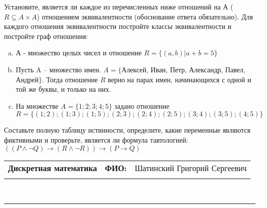 \documentclass[10pt]{exam}
\newcommand{\class}{Дискретная математика}
\newcommand{\examdate}{}
\begin{document}
\begin{questions}
\question
Установите, является ли каждое из перечисленных ниже отношений на А ($R \subseteq A \times A$) отношением эквивалентности (обоснование ответа обязательно). Для каждого отношения эквивалентности постройте классы 
эквивалентности и постройте граф отношения:
\begin{enumerate} [a)]\setcounter{enumi}{0}
\item А - множество целых чисел и отношение $R = \{(a,b)|a + b = 5\}$
\item Пусть A – множество имен. $A = \{ $Алексей, Иван, Петр, Александр, Павел, Андрей$ \}$. Тогда отношение $R $ верно на парах имен, начинающихся с одной и той же буквы, и только на них.
\item На множестве $A = \{1; 2; 3; 4; 5\}$ задано отношение $R = \{(1; 2); (1; 3); (1; 5); (2; 3); (2; 4); (2; 5); (3; 4); (3; 5); (4; 5)\}$
\end{enumerate}\question Составьте полную таблицу истинности, определите, какие переменные являются фиктивными и проверьте, является ли формула тавтологией:
$(( P \land \neg Q) \rightarrow (R \land \neg R)) \rightarrow (P \rightarrow Q)$

\end{questions}
\newpage
\begin{flushright}
\begin{tabular}{p{2.8in} r l}
\textbf{\class} & \textbf{ФИО:} &Шатинский Григорий Сергеевич
\\

\textbf{\examdate} &&\\
\end{tabular}\\
\end{flushright}
\rule[1ex]{\textwidth}{.1pt}
\end{document}

